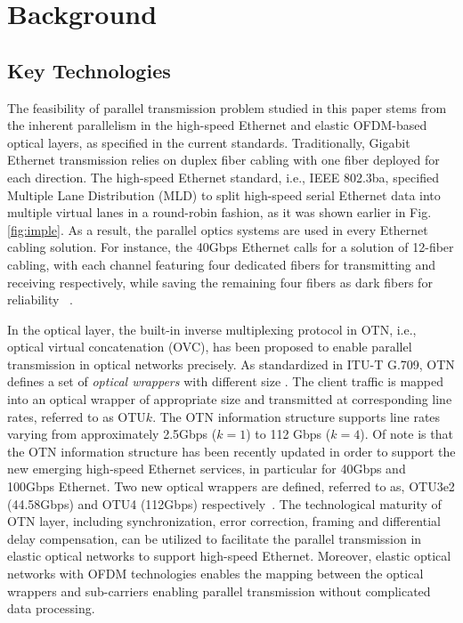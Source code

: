 \documentclass[conference]{IEEEtran}
\begin{document}
 
\section{Background}\label{implementation}
\subsection{Key Technologies} 
\par The feasibility of parallel transmission problem studied in this paper stems from the inherent  parallelism in the high-speed Ethernet and elastic OFDM-based optical layers, as specified in the current standards.  Traditionally,  Gigabit Ethernet transmission relies on duplex fiber cabling with one fiber deployed for each direction. The high-speed Ethernet standard, i.e., IEEE 802.3ba, specified Multiple Lane Distribution (MLD) to  split   high-speed serial Ethernet data  into multiple virtual lanes in a round-robin fashion, as it was shown earlier in  Fig.\ref{fig:imple}. As a result, the parallel optics systems are used in every Ethernet cabling solution. For instance, the 40Gbps  Ethernet calls for a solution of  12-fiber cabling, with  each channel featuring four dedicated fibers for transmitting and receiving respectively, while saving  the remaining  four fibers as dark fibers for reliability~\cite{802.3ba} .   
  
\par In the optical layer, the built-in inverse multiplexing protocol in OTN, i.e.,  optical virtual concatenation (OVC), has been proposed to enable parallel transmission in optical networks precisely.  As standardized in ITU-T G.709, OTN defines a set of \emph{optical wrappers} with different size  \cite{Gumaste:Comag:2010}. The client traffic is  mapped  into an optical wrapper of appropriate size and transmitted at corresponding line rates, referred to as OTU$k$. The OTN information structure supports  line rates varying from approximately 2.5Gbps ($k=1$) to 112 Gbps ($k=4$).  Of note is that the OTN information structure  has been recently updated in order to support the new emerging high-speed Ethernet services, in particular for 40Gbps and 100Gbps Ethernet. Two new optical wrappers are defined, referred to as, OTU3e2 (44.58Gbps) and OTU4 (112Gbps) respectively~\cite{ITU-T:G.709}.   The technological maturity of OTN layer, including synchronization, error correction, framing  and differential delay compensation, can be utilized to facilitate the parallel transmission in elastic optical networks to support high-speed Ethernet.  Moreover, elastic optical networks with OFDM technologies enables the mapping between the optical wrappers and sub-carriers enabling parallel transmission without complicated data processing.     
  
\end{document}
